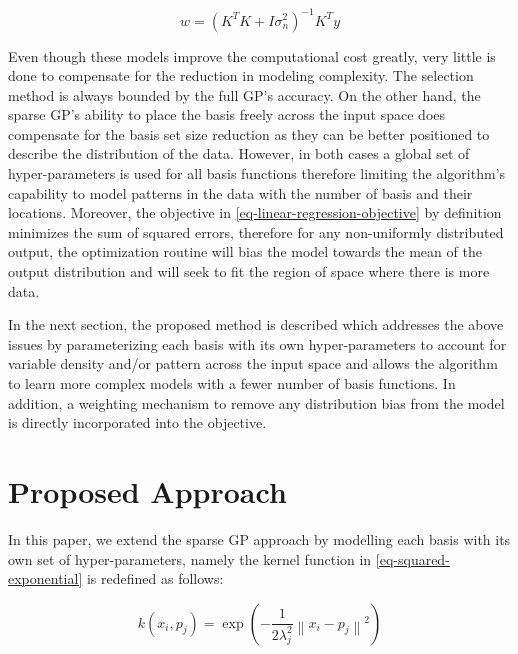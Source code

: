 \documentclass[useAMS,usenatbib,fleqn]{mn2e}
\begin{document}
\begin{equation}
\label{eq-linear-regression-objective-rectangular}
w = \left(K^{T}K+I\sigma_{n}^{2} \right)^{-1}K^{T}y
\end{equation}

Even though these models improve the computational cost greatly, very little is done to compensate for the reduction in modeling complexity. The selection method is always bounded by the full GP's accuracy. On the other hand, the sparse GP's ability to place the basis freely across the input space does compensate for the basis set size reduction as they can be better positioned to describe the distribution of the data. However, in both cases a global set of hyper-parameters is used for all basis functions therefore limiting the algorithm's capability to model patterns in the data with the number of basis and their locations. Moreover, the objective in \eqref{eq-linear-regression-objective} by definition minimizes the sum of squared errors, therefore for any non-uniformly distributed output, the optimization routine will bias the model towards the mean of the output distribution and will seek to fit the region of space where there is more data.

In the next section, the proposed method is described which addresses the above issues by parameterizing each basis with its own hyper-parameters to account for variable density and/or pattern across the input space and allows the algorithm to learn more complex models with a fewer number of basis functions. In addition, a weighting mechanism to remove any distribution bias from the model is directly incorporated into the objective.

\section{Proposed Approach}
\label{sec-proposed-approach}

In this paper, we extend the sparse GP approach by modelling each basis with its own set of hyper-parameters, namely the kernel function in \eqref{eq-squared-exponential} is redefined as follows:

\begin{equation}
\label{eq-squared-exponential-extension}
k(x_{i},p_{j}) = \exp{\left(-\frac{1}{2\lambda_{j}^{2}}\left\| x_{i}-p_{j}\right\|^{2}\right)}
\end{equation}
\end{document}
